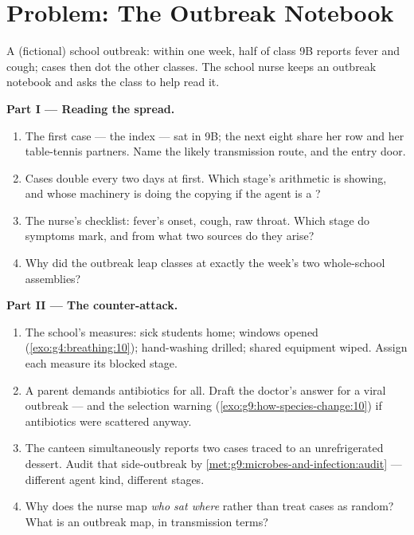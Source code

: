 \section{Problem: The Outbreak Notebook}

\begin{problem}\label{pb:g9:microbes-and-infection:1}
A (fictional) school outbreak: within one week, half of
class 9B reports fever and cough; cases then dot the
other classes. The school nurse keeps an outbreak
notebook and asks the  class to help read it.

\medskip\noindent\textbf{Part I --- Reading the spread.}
\begin{enumerate}
  \item The first case --- the index --- sat in 9B; the
        next eight share her row and her table-tennis
        partners. Name the likely transmission route,
        and the entry door.
  \item Cases double every two days at first. Which
        stage's arithmetic is showing, and whose
        machinery is doing the copying if the agent is a
        ?
  \item The nurse's checklist: fever's onset, cough,
        raw throat. Which stage do symptoms mark, and
        from what two sources do they arise?
  \item Why did the outbreak leap classes at exactly the
        week's two whole-school assemblies?
\end{enumerate}

\medskip\noindent\textbf{Part II --- The counter-attack.}
\begin{enumerate}[resume]
  \item The school's measures: sick students home;
        windows opened
        (\cref{exo:g4:breathing:10}); hand-washing
        drilled; shared equipment wiped. Assign each
        measure its blocked stage.
  \item A parent demands antibiotics for all. Draft the
        doctor's answer for a viral outbreak --- and the
        selection warning
        (\cref{exo:g9:how-species-change:10}) if
        antibiotics were scattered anyway.
  \item The canteen simultaneously reports two 
        cases traced to an unrefrigerated dessert.
        Audit that side-outbreak by
        \cref{met:g9:microbes-and-infection:audit} ---
        different agent kind, different stages.
  \item Why does the nurse map \emph{who sat where}
        rather than treat cases as random? What is an
        outbreak map, in transmission terms?
\end{enumerate}


\end{problem}
